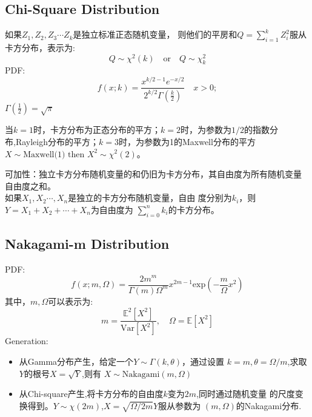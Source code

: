 \documentclass[fontset=none,oneside]{book}
\begin{document}
\subsection{Chi-Square Distribution}
\noindent 如果$Z_{1},Z_{2},Z_{3}\cdots Z_{k}$是独立标准正态随机变量，
则他们的平房和$Q=\sum_{i=1}^{k}Z_{i}^{2}$服从卡方分布，表示为:
\begin{equation}
\label{eq:33}
Q\sim \chi^{2}(k)\quad\text{or}\quad Q\sim\chi_{k}^{2}
\end{equation}
PDF:
\begin{equation}
\label{eq:34}
f(x;k)=\frac{x^{k/2-1}e^{-x/2}}{2^{k/2}\Gamma(\frac{k}{2})} \quad x>0;
\end{equation}
$\Gamma(\frac{1}{2})=\sqrt{\pi}$
\begin{shaded}
当$k=1$时，卡方分布为正态分布的平方；$k=2$时，为参数为$1/2$的指数分
布,Rayleigh分布的平方；$k=3$时，为参数为1的Maxwell分布的平方
$X\sim\text{Maxwell(1) then }X^{2}\sim\chi^{2}(2)$。
\end{shaded}
可加性：独立卡方分布随机变量的和仍旧为卡方分布，其自由度为所有随机变量
自由度之和。\\

如果$X_{1},X_{2}\cdots,X_{n}$是独立的卡方分布随机变量，自由
度分别为$k_{i}$，则$Y=X_{1}+X_{2}+\cdots+X_{n}$为自由度为
$\sum_{i=0}^{n}k_{i}$的卡方分布。
\subsection{Nakagami-m Distribution}
\noindent PDF:
\begin{equation}
\label{eq:37}
f(x;m,\Omega)=\frac{2m^{m}}{\Gamma(m)\Omega^{m}}x^{2m-1}\mathrm{exp}(-\frac{m}{\Omega}x^{2})
\end{equation}
其中，$m,\Omega$可以表示为:
\begin{equation}
\label{eq:38}
m=\frac{\mathbb{E}^{2}[X^{2}]}{\mathrm{Var}[X^{2}]},\quad \Omega=\mathbb{E}[X^{2}]
\end{equation}
Generation:
\begin{itemize}
\item 从Gamma分布产生，给定一个$Y\sim\Gamma(k,\theta)$，通过设置
  $k=m,\theta=\Omega/m$,求取$Y$的根号$X=\sqrt{Y}$,则有
  $X\sim\mathrm{Nakagami}(m,\Omega)$
\item 从Chi-square产生,将卡方分布的自由度$k$变为$2m$,同时通过随机变量
  的尺度变换得到。$Y\sim\chi(2m)$,$X=\sqrt{\Omega/2m}Y$服从参数为
  $(m,\Omega)$的Nakagami分布.
\end{itemize}

 
\end{document}
